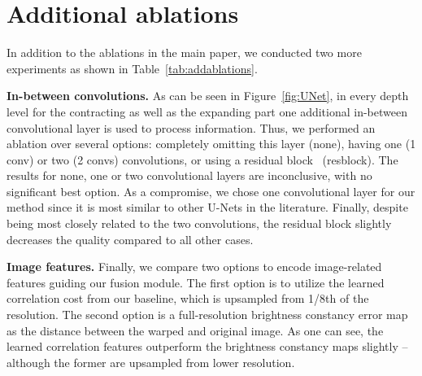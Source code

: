 \documentclass[10pt,twocolumn,letterpaper]{article}
\begin{document}
\section{Additional ablations}
In addition to the ablations in the main paper, we conducted two more experiments as shown in Table~\ref{tab:addablations}.

\medskip
\noindent
\textbf{In-between convolutions.}
As can be seen in Figure~\ref{fig:UNet}, in every depth level for the contracting as well as the expanding part one additional in-between convolutional layer is used to process information.
Thus, we performed an ablation over several options: completely omitting this layer (none), having one (1 conv) or two (2 convs) convolutions, or using a residual block~\cite{He2016_ResNet} (resblock).
The results for none, one or two convolutional layers are inconclusive, with no significant best option.
As a compromise, we chose one convolutional layer for our method since it is most similar to other U-Nets in the literature.
Finally, despite being most closely related to the two convolutions, the residual block slightly decreases the quality compared to all other cases.



\medskip
\noindent
\textbf{Image features.}
Finally, we compare two options to encode image-related features guiding our fusion module.
The first option is to utilize the learned correlation cost from our baseline, which is upsampled from 1/8th of the resolution.
The second option is a full-resolution brightness constancy error map~\cite{Ren2019_FlowTemporalFusion} as the  distance between the warped and original image.
As one can see, the learned correlation features outperform the brightness constancy maps slightly -- although the former are upsampled from lower resolution.
\end{document}
